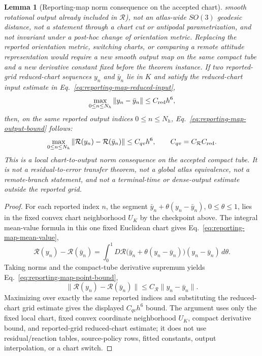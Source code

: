 \documentclass[preprint,12pt]{elsarticle}
\newtheorem{lemma}{Lemma}
\begin{document}
\begin{lemma}[Reporting-map norm consequence on the accepted chart]
smooth rotational output already included in \(\mathcal R\)), not an
atlas-wide \(SO(3)\) geodesic distance, not a statement through a chart cut or
antipodal parametrization, and not invariant under a post-hoc change of
orientation metric.  Replacing the reported orientation metric, switching
charts, or comparing a remote attitude representation would require a new
smooth output map on the same compact tube and a new derivative constant fixed
before the theorem instance.
If two reported-grid reduced-chart sequences \(y_n\) and \(\bar y_n\) lie in
\(K\) and satisfy the reduced-chart input estimate in
Eq.~\eqref{eq:reporting-map-reduced-input},
\begin{equation}
\label{eq:reporting-map-reduced-input}
  \max_{0\le n\le N_h}\|y_n-\bar y_n\|\le C_{\rm red}h^6,
\end{equation}
then, on the same reported output indices \(0\le n\le N_h\),
Eq.~\eqref{eq:reporting-map-output-bound} follows:
\begin{equation}
\label{eq:reporting-map-output-bound}
  \max_{0\le n\le N_h}
  \|\mathcal R(y_n)-\mathcal R(\bar y_n)\|
  \le C_{qv}h^6,\qquad C_{qv}=C_{\mathcal R}C_{\rm red}.
\end{equation}
This is a local chart-to-output norm consequence on the accepted compact
tube. It is not a residual-to-error transfer theorem, not a global atlas
equivalence, not a remote-branch statement, and not a terminal-time or
dense-output estimate outside the reported grid.
\end{lemma}

\begin{proof}
For each reported index \(n\), the segment
\(\bar y_n+\theta(y_n-\bar y_n)\), \(0\le\theta\le1\), lies in the fixed
convex chart neighborhood \(U_K\) by the checkpoint above. The integral
mean-value formula in this one fixed Euclidean chart gives
Eq.~\eqref{eq:reporting-map-mean-value},
\begin{equation}
\label{eq:reporting-map-mean-value}
  \mathcal R(y_n)-\mathcal R(\bar y_n)
  =
  \int_0^1
  D\mathcal R\bigl(\bar y_n+\theta(y_n-\bar y_n)\bigr)
  (y_n-\bar y_n)\,d\theta .
\end{equation}
Taking norms and the compact-tube derivative supremum yields
Eq.~\eqref{eq:reporting-map-point-bound},
\begin{equation}
\label{eq:reporting-map-point-bound}
  \|\mathcal R(y_n)-\mathcal R(\bar y_n)\|
  \le C_{\mathcal R}\|y_n-\bar y_n\|.
\end{equation}
Maximizing over exactly the same reported indices and substituting the
reduced-chart grid estimate gives the displayed \(C_{qv}h^6\) bound. The
argument uses only the fixed local chart, fixed convex coordinate
neighborhood \(U_K\), compact derivative bound, and reported-grid
reduced-chart estimate; it does not use residual/reaction tables,
source-policy rows, fitted constants, output interpolation, or a chart switch.
\end{proof}
\end{document}
